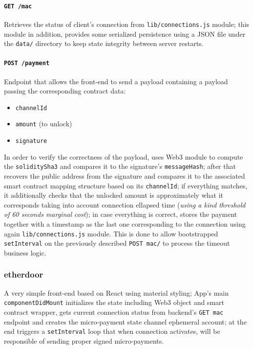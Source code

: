 \documentclass[12pt]{amsart}
\begin{document}
\begin{multicols}{2}
\vspace{0.35cm}

\paragraph{\texttt{GET /mac}} Retrieves the status of client's
connection from \texttt{lib/connections.js} module; this module
in addition, provides some serialized persistence using a JSON
file under the \texttt{data/} directory to keep state integrity
between server restarts.

\vspace{0.35cm}

\paragraph{\texttt{POST /payment}} Endpoint that allows the front-end
to send a payload containing a payload passing the corresponding
contract data:

\begin{itemize}
\item \texttt{channelId}
\item \texttt{amount} (to unlock)
\item \texttt{signature}
\end{itemize}

In order to verify the correctness of the payload, uses Web3
module to compute the \texttt{soliditySha3} and compares it
to the signature's \texttt{messageHash}; after that recovers
the public address from the signature and compares it to
the associated smart contract mapping structure based on its
\texttt{channelId}; if everything matches, it additionally checks
that the unlocked amount is approximately what it corresponds
taking into account connection ellapsed time
(\textit{using a kind threshold of 60 seconds marginal cost});
in case everything is correct, stores the payment together
with a timestamp as the last one corresponding
to the connection using again \texttt{lib/connections.js} module.
This is done to allow bootstrapped \texttt{setInterval}
on the previously described \texttt{POST mac/} to process
the timeout business logic.

\subsubsection{etherdoor} A very simple front-end based on React
using material styling; App's main \texttt{componentDidMount}
initializes the state including Web3 object and smart contract
wrapper, gets current connection status from backend's
\texttt{GET mac} endpoint and creates the micro-payment
state channel ephemeral account; at the end triggers a
\texttt{setInterval} loop that when connection activates,
will be responsible of sending proper signed micro-payments.


\end{multicols}
\end{document}
